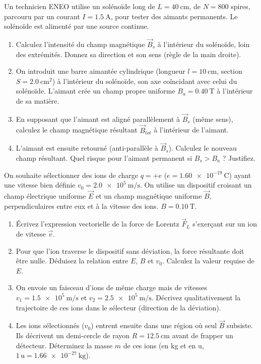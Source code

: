 \documentclass[11pt]{article}
\begin{document}
\begin{exercice}
Un technicien ENEO utilise un solénoïde long de $L = \SI{40}{\centi\meter}$, de $N = 800$ spires, parcouru par un courant $I = \SI{1,5}{\ampere}$, pour tester des aimants permanents. Le solénoïde est alimenté par une source continue.
\begin{enumerate}
    \item Calculez l'intensité du champ magnétique $\vec{B}_s$ à l'intérieur du solénoïde, loin des extrémités. Donnez sa direction et son sens (règle de la main droite).
    \item On introduit une barre aimantée cylindrique (longueur $l = \SI{10}{\centi\meter}$, section $S = \SI{2,0}{\centi\meter^2}$) à l'intérieur du solénoïde, son axe coïncidant avec celui du solénoïde. L'aimant crée un champ propre uniforme $B_a = \SI{0,40}{\tesla}$ à l'intérieur de sa matière.
    \item En supposant que l'aimant est aligné parallèlement à $\vec{B}_s$ (même sens), calculez le champ magnétique résultant $\vec{B}_{tot}$ à l'intérieur de l'aimant.
    \item L'aimant est ensuite retourné (anti-parallèle à $\vec{B}_s$). Calculez le nouveau champ résultant. Quel risque pour l'aimant permanent si $B_s > B_a$ ? Justifiez.
\end{enumerate}
\end{exercice}

\begin{exercice}
On souhaite sélectionner des ions de charge $q = +e$ ($e = \SI{1,60e-19}{\coulomb}$) ayant une vitesse bien définie $v_0 = \SI{2,0e5}{\meter\per\second}$. On utilise un dispositif croisant un champ électrique uniforme $\vec{E}$ et un champ magnétique uniforme $\vec{B}$, perpendiculaires entre eux et à la vitesse des ions. $B = \SI{0,10}{\tesla}$.
\begin{enumerate}
    \item Écrivez l'expression vectorielle de la force de Lorentz $\vec{F}_L$ s'exerçant sur un ion de vitesse $\vec{v}$.
    \item Pour que l'ion traverse le dispositif sans déviation, la force résultante doit être nulle. Déduisez la relation entre $E$, $B$ et $v_0$. Calculez la valeur requise de $E$.
    \item On envoie un faisceau d'ions de même charge mais de vitesses $v_1 = \SI{1,5e5}{\meter\per\second}$ et $v_2 = \SI{2,5e5}{\meter\per\second}$. Décrivez qualitativement la trajectoire de ces ions dans le sélecteur (direction de la déviation).
    \item Les ions sélectionnés ($v_0$) entrent ensuite dans une région où seul $\vec{B}$ subsiste. Ils décrivent un demi-cercle de rayon $R = \SI{12,5}{\centi\meter}$ avant de frapper un détecteur. Déterminez la masse $m$ de ces ions (en kg et en u, $1\,\text{u} = \SI{1,66e-27}{\kilogram}$).
\end{enumerate}
\end{exercice}
\end{document}
